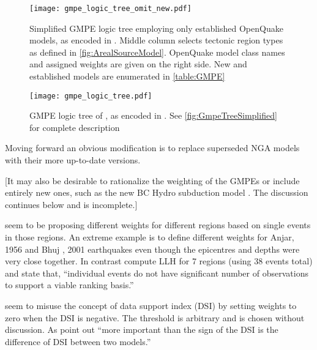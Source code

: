 \documentclass{article}
\begin{document}
\begin{figure}[!htb]
\begin{adjustbox}{center}
\texttt{[image: gmpe\_logic\_tree\_omit\_new.pdf]}
\end{adjustbox}
\caption[Simplified GMPE logic tree]{Simplified GMPE logic tree employing only established OpenQuake models, as encoded in \texttt{}. Middle column selects tectonic region types as defined in \autoref{fig:ArealSourceModel}. OpenQuake model class names and assigned weights are given on the right side. New and established models are enumerated in \autoref{table:GMPE}}
\label{fig:GmpeTreeSimplified}
\end{figure}

\begin{figure}
\begin{adjustbox}{center}
\texttt{[image: gmpe\_logic\_tree.pdf]}
\end{adjustbox}
\caption[Original GMPE logic tree]{GMPE logic tree of \cite{nath2012probabilistic}, as encoded in \texttt{}. See \autoref{fig:GmpeTreeSimplified} for complete description}
\label{fig:GmpeTreeNath}
\end{figure}

Moving forward an obvious modification is to replace superseded NGA models with their more up-to-date versions. 

[It may also be desirable to rationalize the weighting of the GMPEs or include entirely new ones, such as the new BC Hydro subduction model \citep{abrahamson2012bc}. The discussion continues below and is incomplete.]

\cite{anbazhagan2015selection} seem to be proposing different weights for different regions based on single events in those regions. An extreme example is to define different weights for Anjar, 1956 and Bhuj , 2001 earthquakes even though the epicentres and depths were very close together. In contrast \cite{nath2011peak} compute LLH for 7 regions (using 38 events total) and state that, ``individual events do not have significant number of observations to support a viable ranking basis.''

\cite{anbazhagan2015selection} seem to misuse the concept of data support index (DSI) \citep{delavaud2012toward} by setting weights to zero when the DSI is negative. The threshold is arbitrary and is chosen without discussion. As \cite{delavaud2012toward} point out ``more important
than the sign of the DSI is the difference of DSI between
two models.''
\end{document}
